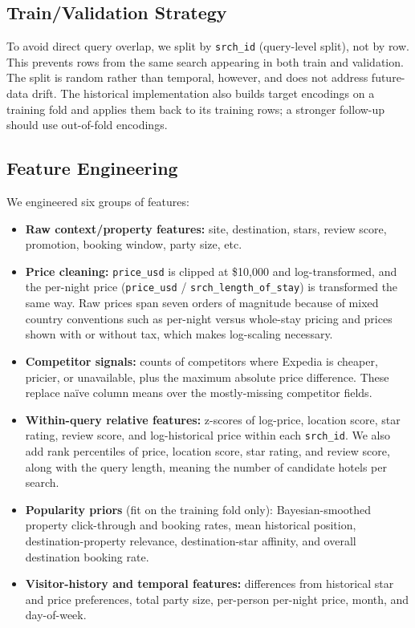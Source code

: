 \documentclass{llncs}
\begin{document}
\subsection{Train/Validation Strategy}
To avoid direct query overlap, we split by \texttt{srch\_id} (query-level split), not by row. This prevents rows from the same search appearing in both train and validation. The split is random rather than temporal, however, and does not address future-data drift. The historical implementation also builds target encodings on a training fold and applies them back to its training rows; a stronger follow-up should use out-of-fold encodings.

\subsection{Feature Engineering}
We engineered six groups of features:
\begin{itemize}
\item \textbf{Raw context/property features:} site, destination, stars, review score, promotion, booking window, party size, etc.
\item \textbf{Price cleaning:} \texttt{price\_usd} is clipped at \$10{,}000 and log-transformed, and the per-night price (\texttt{price\_usd} / \texttt{srch\_length\_of\_stay}) is transformed the same way. Raw prices span seven orders of magnitude because of mixed country conventions such as per-night versus whole-stay pricing and prices shown with or without tax, which makes log-scaling necessary.
\item \textbf{Competitor signals:} counts of competitors where Expedia is cheaper, pricier, or unavailable, plus the maximum absolute price difference. These replace na\"ive column means over the mostly-missing competitor fields.
\item \textbf{Within-query relative features:} z-scores of log-price, location score, star rating, review score, and log-historical price within each \texttt{srch\_id}. We also add rank percentiles of price, location score, star rating, and review score, along with the query length, meaning the number of candidate hotels per search.
\item \textbf{Popularity priors} (fit on the training fold only): Bayesian-smoothed property click-through and booking rates, mean historical position, destination-property relevance, destination-star affinity, and overall destination booking rate.
\item \textbf{Visitor-history and temporal features:} differences from historical star and price preferences, total party size, per-person per-night price, month, and day-of-week.
\end{itemize}
\end{document}

